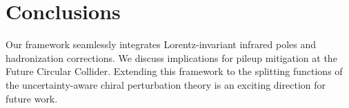 \section{Conclusions}\label{sec:conclusions}

Our framework seamlessly integrates Lorentz-invariant infrared poles and
hadronization corrections. We discuss implications for pileup mitigation
at the Future Circular Collider. Extending this framework to the
splitting functions of the uncertainty-aware chiral perturbation theory
is an exciting direction for future work.

